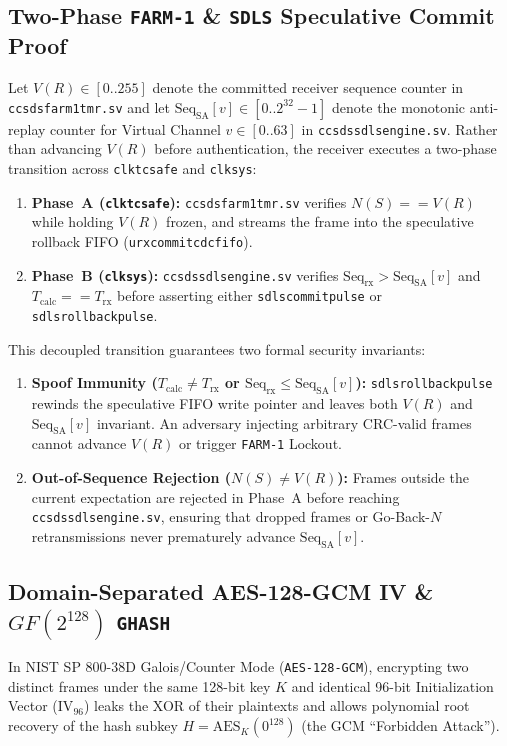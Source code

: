 \documentclass[10pt,a4paper]{article}
\renewcommand{\_}{\origunderscore\penalty0\hskip0pt\relax}
\numberwithin{equation}{section}
\numberwithin{table}{section}
\numberwithin{figure}{section}
\begin{document}
\subsection{Two-Phase \texttt{FARM-1} \& \texttt{SDLS} Speculative Commit Proof}
Let $V(R) \in [0..255]$ denote the committed receiver sequence counter in \texttt{ccsds\_farm1\_tmr.sv} and let $\text{Seq}_{\text{SA}}[v] \in [0..2^{32}-1]$ denote the monotonic anti-replay counter for Virtual Channel $v \in [0..63]$ in \texttt{ccsds\_sdls\_engine.sv}. Rather than advancing $V(R)$ before authentication, the receiver executes a two-phase transition across \texttt{clk\_tc\_safe} and \texttt{clk\_sys}:
\begin{enumerate}\setlength{\itemsep}{1.5pt}
  \item \textbf{Phase~A (\texttt{clk\_tc\_safe}):} \texttt{ccsds\_farm1\_tmr.sv} verifies $N(S) == V(R)$ while holding $V(R)$ frozen, and streams the frame into the speculative rollback FIFO (\texttt{u\_rx\_commit\_cdc\_fifo}).
  \item \textbf{Phase~B (\texttt{clk\_sys}):} \texttt{ccsds\_sdls\_engine.sv} verifies $\text{Seq}_{\text{rx}} > \text{Seq}_{\text{SA}}[v]$ and $T_{\text{calc}} == T_{\text{rx}}$ before asserting either \texttt{sdls\_commit\_pulse} or \texttt{sdls\_rollback\_pulse}.
\end{enumerate}
This decoupled transition guarantees two formal security invariants:
\begin{enumerate}\setlength{\itemsep}{2pt}
  \item \textbf{Spoof Immunity ($T_{\text{calc}} \ne T_{\text{rx}}$ or $\text{Seq}_{\text{rx}} \le \text{Seq}_{\text{SA}}[v]$):} \texttt{sdls\_rollback\_pulse} rewinds the speculative FIFO write pointer and leaves both $V(R)$ and $\text{Seq}_{\text{SA}}[v]$ invariant. An adversary injecting arbitrary CRC-valid frames cannot advance $V(R)$ or trigger \texttt{FARM-1} Lockout.
  \item \textbf{Out-of-Sequence Rejection ($N(S) \ne V(R)$):} Frames outside the current expectation are rejected in Phase~A before reaching \texttt{ccsds\_sdls\_engine.sv}, ensuring that dropped frames or Go-Back-$N$ retransmissions never prematurely advance $\text{Seq}_{\text{SA}}[v]$.
\end{enumerate}

\subsection{Domain-Separated AES-128-GCM IV \& $GF(2^{128})$ \texttt{GHASH}}
In NIST SP 800-38D Galois/Counter Mode (\texttt{AES-128-GCM}), encrypting two distinct frames under the same 128-bit key $K$ and identical 96-bit Initialization Vector ($\text{IV}_{96}$) leaks the XOR of their plaintexts and allows polynomial root recovery of the hash subkey $H = \text{AES}_K(0^{128})$ (the GCM ``Forbidden Attack'').
\end{document}
